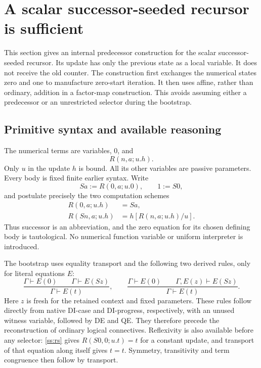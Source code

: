 \section{A scalar successor-seeded recursor is sufficient}
\label{sec:scalar-successor-bootstrap}\label{sec:hybrid-bootstrap}

This section gives an internal predecessor construction for the scalar
successor-seeded recursor.  Its update has only the previous state as a
local variable.  It does not receive the old counter.  The construction
first exchanges the numerical states zero and one to manufacture
zero-start iteration.  It then uses affine, rather than ordinary,
addition in a factor-map construction.  This avoids assuming either a
predecessor or an unrestricted selector during the bootstrap.

\subsection{Primitive syntax and available reasoning}

The numerical terms are variables, $0$, and
\[
 R(n,a;u.h).
\]
Only $u$ in the update $h$ is bound.  All its other variables are passive
parameters.  Every body is fixed finite earlier syntax.  Write
\[
 Sa:=R(0,a;u.0),\qquad 1:=S0,
\]
and postulate precisely the two computation schemes
\begin{align}
 R(0,a;u.h)&=Sa,\tag{R0}\label{ss:r0}\\
 R(Sn,a;u.h)&=h[R(n,a;u.h)/u].\tag{RS}\label{ss:rs}
\end{align}
Thus successor is an abbreviation, and the zero equation for its chosen
defining body is tautological.  No numerical function variable or
uniform interpreter is introduced.

The bootstrap uses equality transport and the following two derived
rules, only for literal equations $E$:
\[
 \frac{\Gamma\vdash E(0)\qquad\Gamma\vdash E(Sz)}
      {\Gamma\vdash E(t)},\qquad
 \frac{\Gamma\vdash E(0)\qquad\Gamma,E(z)\vdash E(Sz)}
      {\Gamma\vdash E(t)}.
 \tag{NC, EI}\label{ss:nc-ei}
\]
Here $z$ is fresh for the retained context and fixed parameters.
These rules follow directly from native DI-case and DI-progress,
respectively, with an unused witness variable, followed by DE and QE.
They therefore precede the reconstruction of ordinary logical
connectives.  Reflexivity is also available before any selector:
\eqref{ss:rs} gives $R(S0,0;u.t)=t$ for a constant update, and transport
of that equation along itself gives $t=t$.  Symmetry, transitivity and
term congruence then follow by transport.

